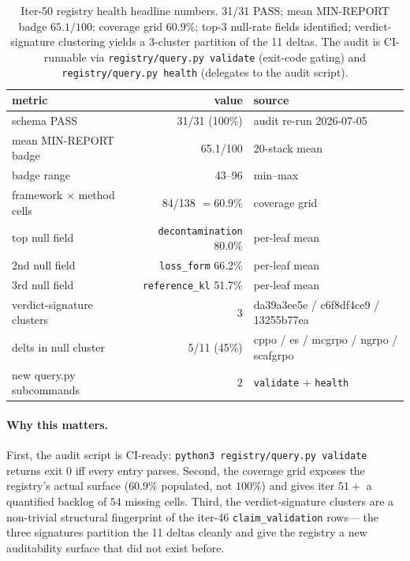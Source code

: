 \documentclass{article}
\begin{document}
\begin{table}[t]
\centering\small
\caption{Iter-50 registry health headline numbers. 31/31 PASS;
mean MIN-REPORT badge $65.1/100$; coverage grid $60.9\%$;
top-3 null-rate fields identified; verdict-signature clustering
yields a 3-cluster partition of the 11 deltas. The audit is
CI-runnable via \texttt{registry/query.py validate} (exit-code
gating) and \texttt{registry/query.py health} (delegates to the
audit script).}
\label{tab:p6-registry-health}
\begin{tabular}{l r l}
\toprule
metric & value & source \\
\midrule
schema PASS                & 31/31 (100\%) & audit re-run 2026-07-05 \\
mean MIN-REPORT badge      & 65.1/100     & 20-stack mean \\
badge range                & 43--96       & min--max \\
framework $\times$ method cells & 84/138 $=60.9\%$ & coverage grid \\
top null field             & \texttt{decontamination} 80.0\% & per-leaf mean \\
2nd null field             & \texttt{loss\_form} 66.2\% & per-leaf mean \\
3rd null field             & \texttt{reference\_kl} 51.7\% & per-leaf mean \\
verdict-signature clusters & 3            & da39a3ee5e / c6f8df4ce9 / 13255b77ea \\
delts in null cluster      & 5/11 (45\%)  & cppo / es / mcgrpo / ngrpo / scafgrpo \\
new query.py subcommands   & 2            & \texttt{validate} + \texttt{health} \\
\bottomrule
\end{tabular}
\end{table}

\paragraph{Why this matters.}
First, the audit script is CI-ready: \texttt{python3 registry/query.py
validate} returns exit $0$ iff every entry parses. Second, the coverage
grid exposes the registry's actual surface ($60.9\%$ populated, not
$100\%$) and gives iter $51+$ a quantified backlog of $54$ missing
cells. Third, the verdict-signature clusters are a non-trivial
structural fingerprint of the iter-46 \texttt{claim\_validation} rows---
the three signatures partition the 11 deltas cleanly and give the
registry a new auditability surface that did not exist before.
\end{document}
